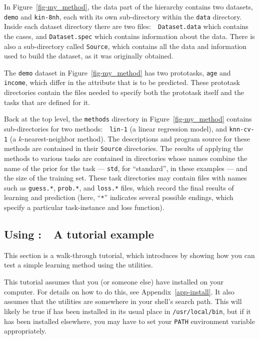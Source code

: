 In Figure~\ref{fig-my_method}, the data part of the hierarchy contains
two datasets, \texttt{demo} and \texttt{kin-8nh}, each with its own
sub-directory within the \texttt{data} directory.  Inside each dataset
directory there are two files:\ \ \texttt{Dataset.data} which contains
the cases, and \texttt{Dataset.spec} which contains information about the
data.  There is also a sub-directory called \texttt{Source}, which
contains all the data and information used to build the dataset, as it
was originally obtained.

The \texttt{demo} dataset in Figure~\ref{fig-my_method} has two
prototasks, \texttt{age} and \texttt{income}, which differ in the
attribute that is to be predicted.  These prototask directories
contain the files needed to specify both the prototask itself and the
tasks that are defined for it.

Back at the top level, the \texttt{methods} directory in
Figure~\ref{fig-my_method} contains sub-directories for two methods:\
\ \texttt{lin-1} (a linear regression model), and \texttt{knn-cv-1} (a
$k$-nearest-neighbor method).  The descriptions and program source for
these methods are contained in their \texttt{Source} directories.  The
results of applying the methods to various tasks are contained in
directories whose names combine the name of the prior for the task ---
\texttt{std}, for ``standard'', in these examples --- and the size of the
training set.  These task directories may contain files with
names such as \texttt{guess.*}, \texttt{prob.*}, and \texttt{loss.*} files, 
which record the final results of learning and prediction (here, ``\texttt{*}''
indicates several possible endings, which specify a particular
task-instance and loss function).


\subsection{Using \delve:~~A tutorial example}\label{intro-tutorial}

This section is a walk-through tutorial, which introduces \delve{} by
showing how you can test a simple learning method using the \delve{}
utilities.

This tutorial assumes that you (or someone else) have installed
\delve{} on your computer.  For details on how to do this, see
Appendix~\ref{app-install}.  It also assumes that the \delve{}
utilities are somewhere in your shell's search path.  This will likely
be true if \delve{} has been installed in its usual place in
\texttt{/usr/local/bin}, but if it has been installed elsewhere, you
may have to set your \texttt{PATH} environment variable appropriately.

